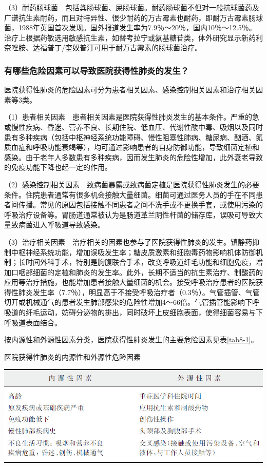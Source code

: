 （3）耐药肠球菌　包括粪肠球菌、屎肠球菌。耐药肠球菌不但对一般抗球菌药及广谱抗生素耐药，而且对特异性、很少耐药的万古霉素也耐药，即耐万古霉素肠球菌，1988年英国首次发现。国外报道发生率为7.9％～20％，国内10％～12.5％。治疗上根据药敏选用敏感抗生素，如替考拉宁或氨基糖苷类，体外研究显示新药利奈唑胺、达福普丁/奎奴普汀可用于耐万古霉素的肠球菌治疗。

\subsubsection{有哪些危险因素可以导致医院获得性肺炎的发生？}

医院获得性肺炎的危险因素可分为患者相关因素、感染控制相关因素和治疗相关因素等3类。

（1）患者相关因素　患者相关因素是医院获得性肺炎发生的基本条件。严重的急或慢性疾病、昏迷、营养不良、长期住院、低血压、代谢性酸中毒、吸烟以及同时患有多种疾病（包括中枢神经系统功能障碍、慢性阻塞性肺病、糖尿病、酗酒、氮质血症和呼吸功能衰竭等），均可通过影响患者的自身防御功能，导致细菌定植和感染。由于老年人多数患有多种疾病，因而发生肺炎的危险性增加，此外衰老导致的免疫功能下降也起一定的作用。

（2）感染控制相关因素　致病菌暴露或致病菌定植是医院获得性肺炎发生的必要条件。住院患者通常有很多机会接触大量细菌。细菌可通过医务人员的手在不同患者间传播。常见的原因包括接触不同患者之间不洗手或不更换手套，或使用污染的呼吸治疗设备等。胃肠道通常被认为是肠道革兰阴性杆菌的储存库，误吸可导致大量致病菌进入呼吸道导致感染。

（3）治疗相关因素　治疗相关的因素也参与了医院获得性肺炎的发生。镇静药抑制中枢神经系统功能，增加误吸发生率；糖皮质激素和细胞毒药物影响机体防御机制；长时间外科手术，特别是胸腹联合手术，改变呼吸道纤毛功能和细胞免疫，增加口咽部细菌的定植和肺炎的发生率。此外，长期不适当的抗生素治疗、制酸药的应用等治疗措施，也能增加患者接触大量细菌的机会。接受呼吸治疗患者的医院获得性肺炎发生率（7.7％），明显高于不接受呼吸治疗者（0.3％）。气管插管、气管切开或机械通气的患者发生肺部感染的危险性增加4～66倍。气管插管能影响下呼吸道的纤毛运动，妨碍分泌物的排出，同时破坏上皮细胞表面，使得细菌容易与下呼吸道表面结合。

按内源性和外源性因素分类，医院获得性肺炎发生的主要危险因素见表\ref{tab8-1}。

\begin{table}[htbp]
\centering
\caption{医院获得性肺炎的内源性和外源性危险因素}
\label{tab8-1}
\includegraphics{./images/Image00059.jpg}
\end{table}

